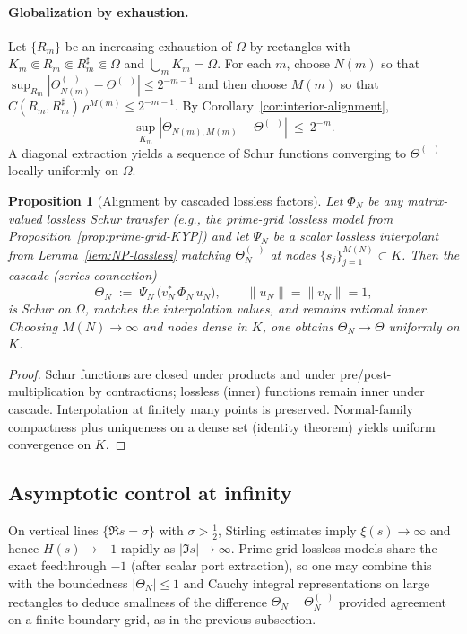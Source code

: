 \documentclass[11pt]{article}
\newtheorem{proposition}[theorem]{Proposition}
\theoremstyle{definition}
\theoremstyle{remark}
\DeclareMathOperator{\dettwo}{det_2}
\begin{document}
\paragraph{Globalization by exhaustion.}
Let \(\{R_m\}\) be an increasing exhaustion of \(\Omega\) by rectangles with \(K_m\Subset R_m\Subset R_m^\sharp\Subset\Omega\) and \(\bigcup_m K_m=\Omega\). For each \(m\), choose \(N(m)\) so that \(\sup_{R_m}|\Theta_{N(m)}^{(\dettwo)}-\Theta^{(\dettwo)}|\le 2^{-m-1}\) and then choose \(M(m)\) so that \(C(R_m,R_m^\sharp)\,\rho^{M(m)}\le 2^{-m-1}\). By Corollary~\ref{cor:interior-alignment},
\[
 \sup_{K_m}|\Theta_{N(m),M(m)}-\Theta^{(\dettwo)}|\ \le\ 2^{-m}.
\]
A diagonal extraction yields a sequence of Schur functions converging to \(\Theta^{(\dettwo)}\) locally uniformly on \(\Omega\).
\begin{proposition}[Alignment by cascaded lossless factors]\label{prop:cascade}
Let \(\Phi_N\) be any matrix-valued lossless Schur transfer (e.g., the prime-grid lossless model from Proposition~\ref{prop:prime-grid-KYP}) and let \(\Psi_N\) be a scalar lossless interpolant from Lemma~\ref{lem:NP-lossless} matching \(\Theta_N^{(\dettwo)}\) at nodes \(\{s_j\}_{j=1}^{M(N)}\subset K\). Then the cascade (series connection)
\[
 \Theta_N\;:=\;\Psi_N\,\big(v_N^*\,\Phi_N\,u_N\big),\qquad \|u_N\|=\|v_N\|=1,
\]
is Schur on \(\Omega\), matches the interpolation values, and remains rational inner. Choosing \(M(N)\to\infty\) and nodes dense in \(K\), one obtains \(\Theta_N\to \Theta\) uniformly on \(K\).
\end{proposition}
\begin{proof}
Schur functions are closed under products and under pre/post-multiplication by contractions; lossless (inner) functions remain inner under cascade. Interpolation at finitely many points is preserved. Normal-family compactness plus uniqueness on a dense set (identity theorem) yields uniform convergence on \(K\).
\end{proof}
\subsection{Asymptotic control at infinity}
On vertical lines \(\{\Re s=\sigma\}\) with \(\sigma>\tfrac12\), Stirling estimates imply \(\xi(s)\to\infty\) and hence \(H(s)\to -1\) rapidly as \(|\Im s|\to\infty\). Prime-grid lossless models share the exact feedthrough \(-1\) (after scalar port extraction), so one may combine this with the boundedness \(|\Theta_N|\le 1\) and Cauchy integral representations on large rectangles to deduce smallness of the difference \(\Theta_N-\Theta_N^{(\dettwo)}\) provided agreement on a finite boundary grid, as in the previous subsection.
\end{document}
